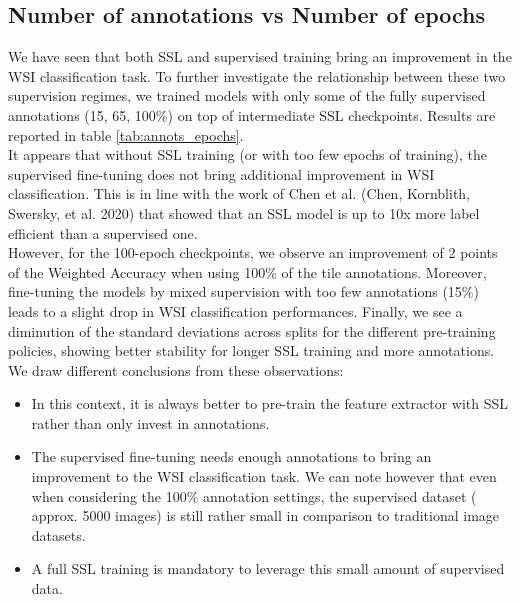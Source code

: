 \subsection{Number of annotations vs Number of epochs}

We have seen that both SSL and supervised training bring an improvement in the WSI classification task. To further investigate the relationship between these two supervision regimes, we trained models with only some of the fully supervised annotations (15, 65, 100\%) on top of intermediate SSL checkpoints.
Results are reported in table \ref{tab:annots_epochs}. \\
It appears that without SSL training (or with too few epochs of training), the supervised fine-tuning does not bring additional improvement in WSI classification. This is in line with the work of Chen et al. (Chen, Kornblith, Swersky, et al. 2020) that showed that an SSL model is up to 10x more label efficient than a supervised one. \\
However, for the 100-epoch checkpoints, we observe an improvement of 2 points of the Weighted Accuracy when using 100\% of the tile annotations.
Moreover, fine-tuning the models by mixed supervision with too few annotations (15\%) leads to a slight drop in WSI classification performances.
Finally, we see  a diminution of the standard deviations across splits for the different pre-training policies, showing better stability for longer SSL training and more annotations. \\

We draw different conclusions from these observations:
\begin{itemize}
\item In this context, it is always better to pre-train the feature extractor with SSL rather than only invest in annotations.
\item The supervised fine-tuning needs enough annotations to bring an improvement to the WSI classification task. We can note however that even when considering the 100\% annotation settings, the supervised dataset ( approx. 5000 images) is still rather small in comparison to traditional image datasets.
\item A full SSL training is mandatory to leverage this small amount of supervised data. 
\end{itemize}

